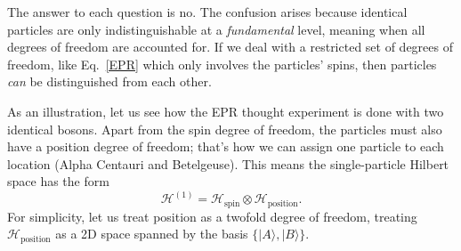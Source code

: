\documentclass[prx,12pt]{revtex4-2}
\begin{document}
The answer to each question is no.  The confusion arises because
identical particles are only indistinguishable at a
\textit{fundamental} level, meaning when all degrees of freedom are
accounted for.  If we deal with a restricted set of degrees of
freedom, like Eq.~\eqref{EPR} which only involves the particles'
spins, then particles \textit{can} be distinguished from each other.

As an illustration, let us see how the EPR thought experiment is done
with two identical bosons.  Apart from the spin degree of freedom, the
particles must also have a position degree of freedom; that's how we
can assign one particle to each location (Alpha Centauri and
Betelgeuse).  This means the single-particle Hilbert space has the
form
\begin{equation}
  \mathscr{H}^{(1)} = \mathscr{H}_{\mathrm{spin}} \otimes \mathscr{H}_{\mathrm{position}}.
\end{equation}
For simplicity, let us treat position as a twofold degree of freedom,
treating $\mathscr{H}_{\mathrm{position}}$ as a 2D space spanned by
the basis $\{|A\rangle, |B\rangle\}$.
\end{document}
